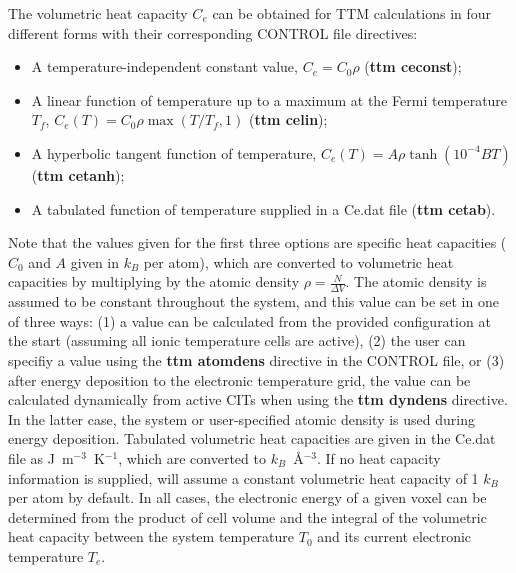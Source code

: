 The volumetric heat capacity $C_e$ 
can be obtained for TTM calculations in four different forms with their 
corresponding CONTROL file directives: 
\begin{itemize}
\item A temperature-independent constant value, $C_e = C_0 \rho$ ({\bf ttm ceconst});
\item A linear function of temperature up to a maximum at the Fermi temperature $T_{f}$, $C_e (T) = C_0 \rho \max \left(T/T_{f}, 1\right)$ ({\bf ttm celin});
\item A hyperbolic tangent function of temperature, $C_e (T) = A \rho \tanh \left(10^{-4} B T\right)$ ({\bf ttm cetanh});
\item A tabulated function of temperature supplied in a Ce.dat file  ({\bf ttm cetab}).
\end{itemize}
Note that the values given for the first three options are specific heat 
capacities ($C_0$ and $A$ given in $k_B$ per atom), which are 
converted to volumetric heat capacities by multiplying by the atomic 
density $\rho = \frac{N}{\Delta V}$. The atomic density is assumed to 
be constant throughout the system, and this value can be set in one of three
ways: (1) a value can be calculated from the provided configuration at the 
start (assuming all ionic temperature cells are active), (2) the user can 
specifiy a value using the {\bf ttm atomdens} directive in the CONTROL file, 
or (3) after energy deposition to the electronic temperature grid, the value
can be calculated dynamically from active CITs when using the {\bf ttm dyndens} 
directive. In the latter case, the system or user-specified atomic density is
used during energy deposition. Tabulated volumetric heat capacities are 
given in the Ce.dat file as J~m$^{-3}$~K$^{-1}$, which are converted to 
$k_B$~\AA$^{-3}$. If no heat capacity information is supplied, \D will 
assume a constant volumetric heat capacity of 1 $k_B$ per atom by 
default. In all cases, the electronic energy of a given voxel can be 
determined from the product of cell volume and the integral of the 
volumetric heat capacity between the system temperature $T_0$ 
and its current electronic temperature $T_e$.

